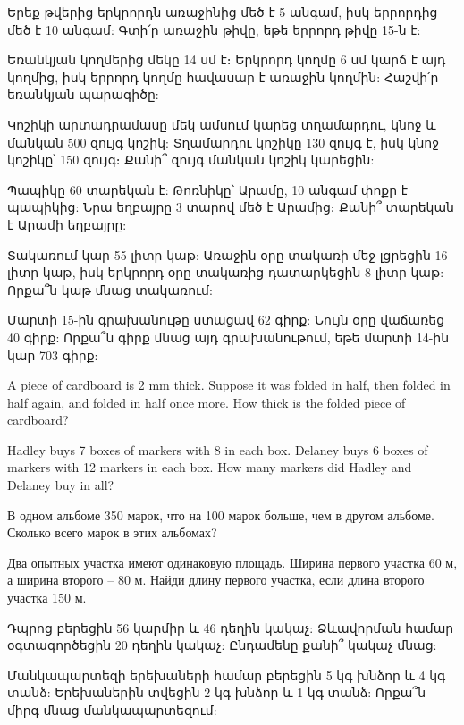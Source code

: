 





\textproblem Երեք թվերից երկրորդն առաջինից մեծ է 5 անգամ,
իսկ երրորդից մեծ է 10 անգամ: Գտի՛ր առաջին թիվը, եթե երրորդ
թիվը 15-ն է:

\textproblem Եռանկյան կողմերից մեկը 14 սմ է։ Երկրորդ կողմը
6 սմ կարճ է այդ կողմից, իսկ երրորդ կողմը հավասար է առաջին
կողմին: Հաշվի՛ր եռանկյան պարագիծը:

\textproblem Կոշիկի արտադրամասը մեկ ամսում կարեց տղամարդու,
կնոջ և մանկան 500 զույգ կոշիկ: Տղամարդու կոշիկը 130 զույգ
է, իսկ կնոջ կոշիկը՝ 150 զույգ։ Քանի՞ զույգ մանկան կոշիկ
կարեցին:

\textproblem Պապիկը 60 տարեկան է: Թոռնիկը՝ Արամը, 10 անգամ
փոքր է պապիկից: Նրա եղբայրը 3 տարով մեծ է Արամից։ Քանի՞
տարեկան է Արամի եղբայրը:

\textproblem Տակառում կար 55 լիտր կաթ: Առաջին օրը տակառի
մեջ լցրեցին 16 լիտր կաթ, իսկ երկրորդ օրը տակառից դատարկեցին
8 լիտր կաթ: Որքա՞ն կաթ մնաց տակառում:

\textproblem Մարտի 15-ին գրախանութը ստացավ 62 գիրք: Նույն
օրը վաճառեց 40 գիրք: Որքա՞ն գիրք մնաց այդ գրախանութում,
եթե մարտի 14-ին կար 703 գիրք:

\textproblem A piece of cardboard is 2 mm thick. Suppose
it was folded in half, then folded in half again, and
folded in half once more. How thick is the folded piece
of cardboard?

\textproblem Hadley buys 7 boxes of markers with 8 in each box.
Delaney buys 6 boxes of markers with 12 markers in each box.
How many markers did Hadley and Delaney buy in all?

\textproblem В одном альбоме 350 марок, что на  100 марок
больше, чем в другом альбоме. Сколько  всего марок в этих
альбомах?

\textproblem  Два опытных участка имеют одинаковую площадь.
Ширина первого участка 60 м, а ширина второго – 80 м. Найди
длину первого участка, если длина второго участка 150 м.


\textproblem Դպրոց բերեցին 56 կարմիր և 46 դեղին կակաչ:
Ձևավորման համար օգտագործեցին 20 դեղին կակաչ: Ընդամենը
քանի՞ կակաչ մնաց:

\textproblem Մանկապարտեզի երեխաների համար բերեցին 5 կգ
խնձոր և 4 կգ տանձ: Երեխաներին տվեցին 2 կգ խնձոր և 1 կգ
տանձ: Որքա՞ն միրգ մնաց մանկապարտեզում:

